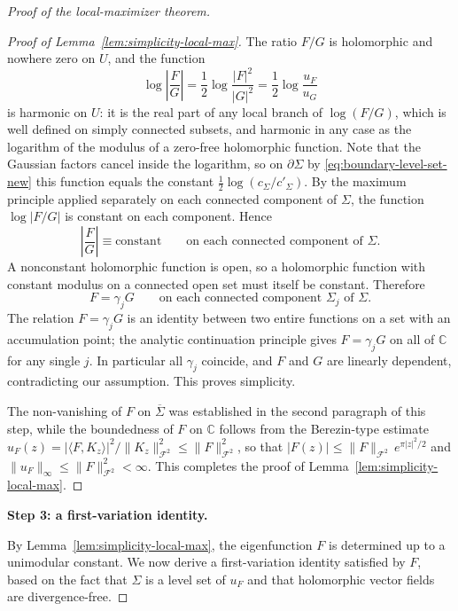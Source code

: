 \documentclass[a4paper,11pt,reqno]{amsart}
\numberwithin{equation}{section}
\theoremstyle{plain} %
\theoremstyle{definition} %
\theoremstyle{remark}
\newcommand{\C}{\mathbb{C}}
\begin{document}
\begin{proof}[Proof of the local-maximizer theorem]
\begin{proof}[Proof of Lemma~\ref{lem:simplicity-local-max}]
The ratio \(F/G\) is holomorphic and nowhere zero on \(U\), and the function
\[
\log \left|\frac{F}{G}\right|
=
\frac12 \log \frac{|F|^2}{|G|^2}
=
\frac12 \log \frac{u_F}{u_G}
\]
is harmonic on \(U\): it is the real part of any local branch of
\(\log(F/G)\), which is well defined on simply connected subsets, and harmonic
in any case as the logarithm of the modulus of a zero-free holomorphic
function. Note that the Gaussian factors cancel inside the logarithm, so on
\(\partial \Sigma\) by \eqref{eq:boundary-level-set-new} this function equals
the constant \(\frac12\log(c_\Sigma/c'_\Sigma)\). By the maximum principle
applied separately on each connected component of \(\Sigma\), the function
\(\log|F/G|\) is constant on each component. Hence
\[
\left|\frac{F}{G}\right| \equiv \text{constant}
\qquad \text{on each connected component of } \Sigma.
\]
A nonconstant holomorphic function is open, so a holomorphic function with
constant modulus on a connected open set must itself be constant. Therefore
\[
F=\gamma_j G
\qquad \text{on each connected component } \Sigma_j\text{ of } \Sigma.
\]
The relation \(F=\gamma_j G\) is an identity between two entire functions on a
set with an accumulation point; the analytic continuation principle gives
\(F=\gamma_j G\) on all of \(\C\) for any single \(j\). In particular all
\(\gamma_j\) coincide, and \(F\) and \(G\) are linearly dependent, contradicting
our assumption. This proves simplicity.

The non-vanishing of \(F\) on \(\overline\Sigma\) was established in the
second paragraph of this step, while the boundedness of \(F\) on \(\C\)
follows from the Berezin-type estimate
\(u_F(z)=|\langle F,K_z\rangle|^2/\|K_z\|^2_{\mathcal F^2}\le
\|F\|_{\mathcal F^2}^2\), so that
\(|F(z)|\le \|F\|_{\mathcal F^2}\,e^{\pi|z|^2/2}\) and
\(\|u_F\|_\infty\le \|F\|_{\mathcal F^2}^2<\infty\). This completes the proof
of Lemma~\ref{lem:simplicity-local-max}.
\end{proof}

\medskip
\noindent
{\bf Step 3: a first-variation identity.}

By Lemma~\ref{lem:simplicity-local-max}, the eigenfunction \(F\) is determined
up to a unimodular constant. We now derive a first-variation identity
satisfied by \(F\), based on the fact that \(\Sigma\) is a level set of
\(u_F\) and that holomorphic vector fields are divergence-free.


\end{proof}
\end{document}
